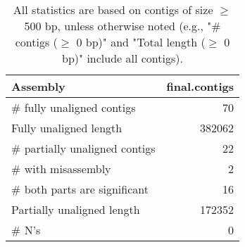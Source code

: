 \documentclass[12pt,a4paper]{article}
\begin{document}
\begin{table}[ht]
\begin{center}
\caption{All statistics are based on contigs of size $\geq$ 500 bp, unless otherwise noted (e.g., "\# contigs ($\geq$ 0 bp)" and "Total length ($\geq$ 0 bp)" include all contigs).}
\begin{tabular}{|l*{1}{|r}|}
\hline
Assembly & final.contigs \\ \hline
\# fully unaligned contigs & 70 \\ \hline
Fully unaligned length & 382062 \\ \hline
\# partially unaligned contigs & 22 \\ \hline
\hspace{5mm}\# with misassembly & 2 \\ \hline
\hspace{5mm}\# both parts are significant & 16 \\ \hline
Partially unaligned length & 172352 \\ \hline
\# N's & 0 \\ \hline
\end{tabular}
\end{center}
\end{table}
\end{document}
